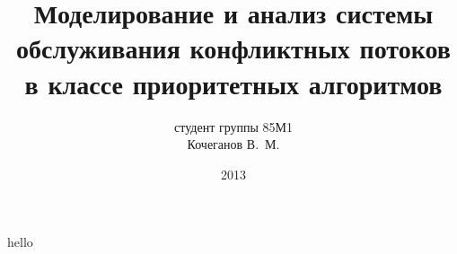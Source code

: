 \documentclass[a4paper,14pt,russian]{article}
\title{Моделирование и анализ системы обслуживания конфликтных потоков в классе приоритетных алгоритмов}
\author{студент группы 85М1\\ Кочеганов В.~М.}
\date{2013}
\begin{document}
hello
\end{document}
